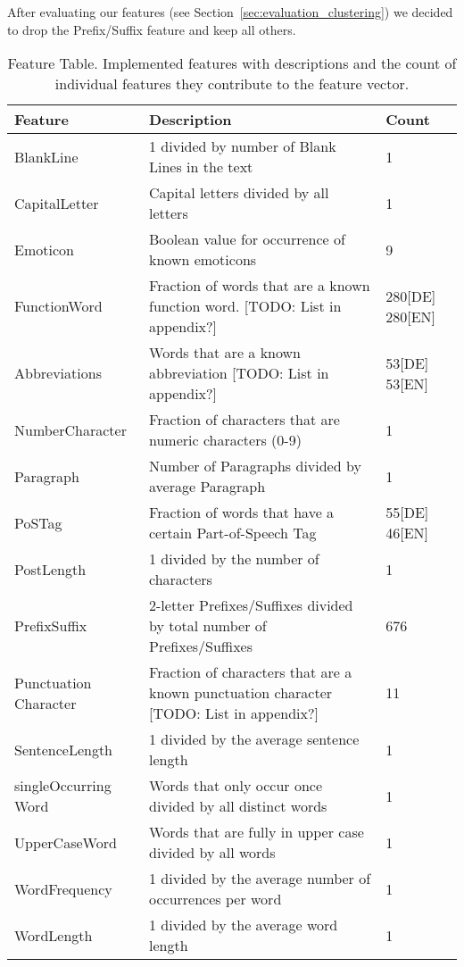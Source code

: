 After evaluating our features (see Section~\ref{sec:evaluation_clustering}) we decided to drop the Prefix/Suffix feature and keep all others.

\begin{table}[h]
    \begin{center}
    \begin{tabular}{p{2.6cm}|p{8.2cm}|p{1.2cm}}
    Feature					& Description																	& Count				\\ \hline
    BlankLine				& 1 divided by number of Blank Lines in the text								& 1					\\ \hline
    CapitalLetter			& Capital letters divided by all letters										& 1					\\ \hline
    Emoticon				& Boolean value for occurrence of known emoticons								& 9					\\ \hline
    FunctionWord			& Fraction of words that are a known function word. [TODO: List in appendix?]	& 280[DE] 280[EN]	\\ \hline
    Abbreviations			& Words that are a known abbreviation [TODO: List in appendix?]					& 53[DE] 53[EN]		\\ \hline
    NumberCharacter			& Fraction of characters that are numeric characters (0-9)						& 1					\\ \hline
    Paragraph				& Number of Paragraphs divided by average Paragraph								& 1					\\ \hline
    PoSTag					& Fraction of words that have a certain Part-of-Speech Tag~\cite{toutanova2000enriching}                                                                                                        & 55[DE] 46[EN]  	\\ \hline
    PostLength				& 1 divided by the number of characters											& 1					\\ \hline
    PrefixSuffix			& 2-letter Prefixes/Suffixes divided by total number of Prefixes/Suffixes		& 676 			 	\\ \hline
    Punctuation Character	& Fraction of characters that are a known punctuation character [TODO: List in appendix?]
                                                                                                            & 11				\\ \hline
    SentenceLength			& 1 divided by the average sentence length										& 1 				\\ \hline
    singleOccurring Word	& Words that only occur once divided by all distinct words						& 1					\\ \hline
    UpperCaseWord			& Words that are fully in upper case divided by all words						& 1					\\ \hline
    WordFrequency			& 1 divided by the average number of occurrences per word						& 1					\\ \hline
    WordLength				& 1 divided by the average word length											& 1					\\
    \end{tabular}
    \end{center}
	\caption{Feature Table. Implemented features with descriptions and the count of individual features they contribute to the feature vector.}
	\label{tab:featureTable}
\end{table}
